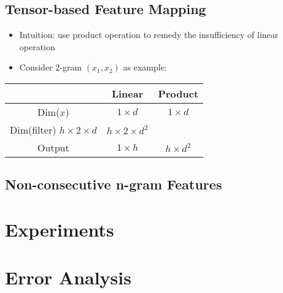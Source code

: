 \documentclass[compress]{beamer}
\begin{document}
\subsection{Tensor-based Feature Mapping}
\begin{frame}{\subsecname}
    \begin{itemize}
    \item Intuition: use product operation to remedy the insufficiency of linear operation
    \item Consider 2-gram $(x_1, x_2)$ as example:
    \end{itemize}
    \begin{table}[t]
        \centering
        \label{compare}
        \begin{tabular}{ccc}
                                       & Linear                  & Product     \\ \hline
        Dim($x$)                       & $1\times d$             & $1\times d$ \\ \hline
        Dim(filter) $h\times2\times d$ & $h\times 2 \times d^2$ \\ \hline
        Output                         & $1\times h$             & $h \times d^2$ \hline

        \end{tabular}
    \end{table}
\end{frame}

\subsection{Non-consecutive n-gram Features}
\begin{frame}{\secname}
    
\end{frame}


\section{Experiments}
\begin{frame}{\secname}
\end{frame}

\section{Error Analysis}
\begin{frame}{\secname}
\end{frame}
\end{document}
